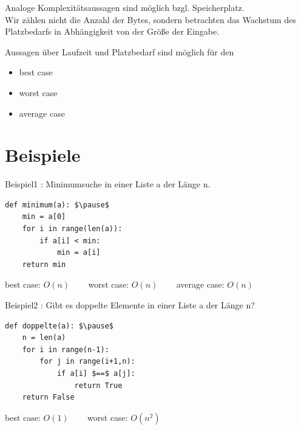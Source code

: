 \documentclass{beamer}
\begin{document}
\begin{frame}[fragile]
Analoge Komplexitätsaussagen sind möglich bzgl. Speicherplatz. \\
Wir zählen nicht die Anzahl der Bytes, sondern betrachten das Wachstum des Platzbedarfs 
 in Abhängigkeit von der Größe der Eingabe.  \pause

Aussagen über Laufzeit und Platzbedarf sind möglich für den
\begin{itemize}
\item best case
\item worst case 
\item average case
\end{itemize}

\end{frame}


\section{Beispiele}
\begin{frame}[fragile]
Beispiel1 : Minimumsuche in einer Liste a der Länge n.  

\begin{lstlisting} 
def minimum(a): $\pause$
    min = a[0]
    for i in range(len(a)):
        if a[i] < min:
            min = a[i]
    return min
\end{lstlisting}  

best case: \pause $O(n)$  ~~~    worst case:    $O(n)$    ~~~ average case:   $O(n)$  
\end{frame}


\begin{frame}[fragile]
Beispiel2 :  Gibt es doppelte Elemente in einer Liste a der Länge n? 
\begin{lstlisting} 
def doppelte(a): $\pause$
    n = len(a)   
    for i in range(n-1):
        for j in range(i+1,n):
            if a[i] $==$ a[j]:
                return True
    return False

\end{lstlisting}  

best case: \pause $O(1)$  ~~~   worst case:   $O(n^2)$
\end{frame}
 
\end{document}
